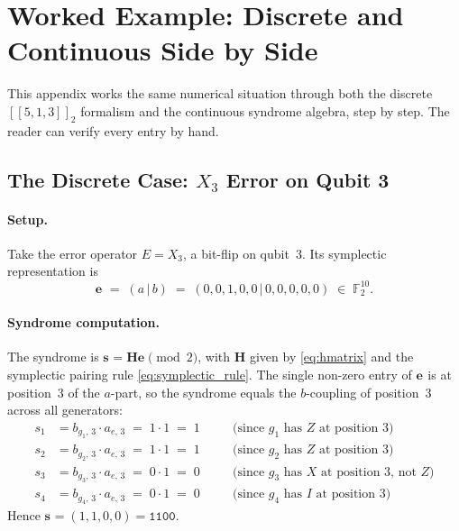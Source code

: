 \documentclass[11pt,a4paper]{article}
\theoremstyle{definition}
\newcommand{\Hm}{\mathbf{H}}
\newcommand{\sk}[1][]{\mathbf{s}_{#1}}
\newcommand{\ek}[1][]{\mathbf{e}_{#1}}
\newcommand{\Fbb}{\mathbb{F}}
\begin{document}
\newpage

\section{Worked Example: Discrete and Continuous Side by Side}
\label{app:worked}

This appendix works the same numerical situation through both the discrete $[\![5,1,3]\!]_2$ formalism and the continuous syndrome algebra, step by step. The reader can verify every entry by hand.

\subsection{The Discrete Case: \texorpdfstring{$X_3$}{X3} Error on Qubit 3}
\label{sec:appB_discrete}

\paragraph{Setup.}
Take the error operator $E = X_3$, a bit-flip on qubit~$3$. Its symplectic representation is
\[
  \ek \;=\; (a\,|\,b)
       \;=\; (0,0,1,0,0\,|\,0,0,0,0,0) \;\in\; \Fbb_2^{10}.
\]

\paragraph{Syndrome computation.}
The syndrome is $\sk = \Hm\ek \pmod 2$, with $\Hm$ given by \eqref{eq:hmatrix} and the symplectic pairing rule \eqref{eq:symplectic_rule}. The single non-zero entry of $\ek$ is at position~$3$ of the $a$-part, so the syndrome equals the $b$-coupling of position~$3$ across all generators:
\begin{align*}
  s_1 &= b_{g_1,\,3} \cdot a_{e,\,3} \;=\; 1\cdot 1 \;=\; 1
       \quad &&\text{(since $g_1$ has $Z$ at position $3$)} \\
  s_2 &= b_{g_2,\,3} \cdot a_{e,\,3} \;=\; 1\cdot 1 \;=\; 1
       \quad &&\text{(since $g_2$ has $Z$ at position $3$)} \\
  s_3 &= b_{g_3,\,3} \cdot a_{e,\,3} \;=\; 0\cdot 1 \;=\; 0
       \quad &&\text{(since $g_3$ has $X$ at position $3$, not $Z$)} \\
  s_4 &= b_{g_4,\,3} \cdot a_{e,\,3} \;=\; 0\cdot 1 \;=\; 0
       \quad &&\text{(since $g_4$ has $I$ at position $3$)}
\end{align*}
Hence $\sk = (1, 1, 0, 0) = \mathtt{1100}$.
\end{document}
